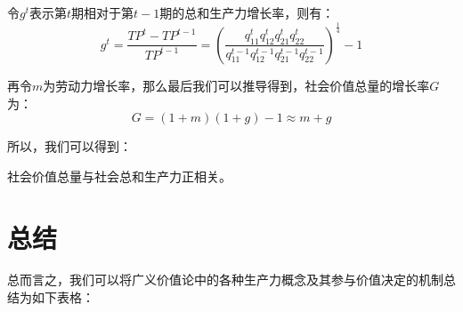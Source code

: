 令$g^t$表示第$t$期相对于第$t-1$期的总和生产力增长率，则有\cite[291]{CaiJiMingCongGuDianZhengZhiJingJiXueDaoZhongGuoTeSeSheHuiZhuYiZhengZhiJingJiXueJiYuZhongGuoShiJiaoDeZhengZhiJingJiXueYanBianShangCe2023}：
\begin{equation}
    g^t = \frac{\mathit{TP}^t - \mathit{TP}^{t-1}}{\mathit{TP}^{t-1}} = \left( \frac{q_{11}^t q_{12}^t q_{21}^t q_{22}^t}{q_{11}^{t-1} q_{12}^{t-1} q_{21}^{t-1} q_{22}^{t-1}} \right)^\frac{1}{4} - 1
\end{equation}

再令$m$为劳动力增长率，那么最后我们可以推导得到，社会价值总量的增长率$G$为：
\begin{equation}
    G = \left( 1+m \right) \left( 1+g \right) - 1 \approx m + g
\end{equation}

所以，我们可以得到：
\begin{theorem}
    社会价值总量与社会总和生产力正相关\cite[291]{CaiJiMingCongXiaYiJieZhiLunDaoGuangYiJieZhiLunXiuDingBan2022}。
\end{theorem}

\section{总结}

总而言之，我们可以将广义价值论中的各种生产力概念及其参与价值决定的机制总结为如下表格：

